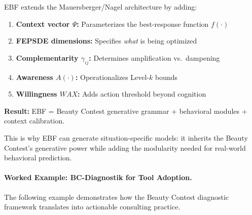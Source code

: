 \begin{tcolorbox}[colback=blue!5!white, colframe=blue!75!black,
    title=\textbf{EBF Implication: Generalized Beauty Contest + Context + Modules}]

EBF extends the Mauersberger/Nagel architecture by adding:

\begin{enumerate}[nosep]
    \item \textbf{Context vector $\Psi$:} Parameterizes the best-response function $f(\cdot)$
    \item \textbf{FEPSDE dimensions:} Specifies \textit{what} is being optimized
    \item \textbf{Complementarity $\gamma_{ij}$:} Determines amplification vs.\ dampening
    \item \textbf{Awareness $A(\cdot)$:} Operationalizes Level-$k$ bounds
    \item \textbf{Willingness $WAX$:} Adds action threshold beyond cognition
\end{enumerate}

\textbf{Result:} EBF = Beauty Contest generative grammar + behavioral modules + context calibration.

This is why EBF can generate situation-specific models: it inherits the Beauty Contest's generative
power while adding the modularity needed for real-world behavioral prediction.

\end{tcolorbox}

\paragraph{Worked Example: BC-Diagnostik for Tool Adoption.}

The following example demonstrates how the Beauty Contest diagnostic framework translates
into actionable consulting practice.

